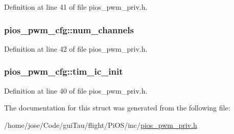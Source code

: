 Definition at line 41 of file pios\-\_\-pwm\-\_\-priv.\-h.

\hypertarget{structpios__pwm__cfg_acf9d41bfa9ce5ee489fcb27a98605e5c}{
\subsubsection[{num\-\_\-channels}]{ pios\-\_\-pwm\-\_\-cfg\-::num\-\_\-channels}}\label{structpios__pwm__cfg_acf9d41bfa9ce5ee489fcb27a98605e5c}


Definition at line 42 of file pios\-\_\-pwm\-\_\-priv.\-h.

\hypertarget{structpios__pwm__cfg_a7f64d325db8aca0d737d94648b079b36}{
\subsubsection[{tim\-\_\-ic\-\_\-init}]{ pios\-\_\-pwm\-\_\-cfg\-::tim\-\_\-ic\-\_\-init}}\label{structpios__pwm__cfg_a7f64d325db8aca0d737d94648b079b36}


Definition at line 40 of file pios\-\_\-pwm\-\_\-priv.\-h.



The documentation for this struct was generated from the following file\-:\begin{DoxyCompactItemize}
\item 
/home/jose/\-Code/gui\-Tau/flight/\-Pi\-O\-S/inc/\hyperlink{pios__pwm__priv_8h}{pios\-\_\-pwm\-\_\-priv.\-h}\end{DoxyCompactItemize}
